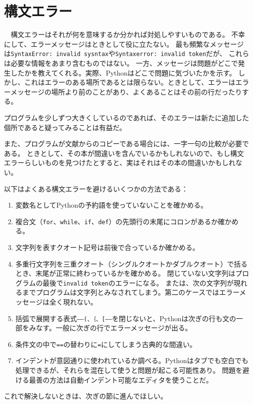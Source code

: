 \documentclass[a4j,12pt,makeidx]{jbook}
\begin{document}
\section{構文エラー}
　構文エラーはそれが何を意味するか分かれば対処しやすいものである。
不幸にして、エラーメッセージはときとして役に立たない。
最も頻繁なメッセージは{\tt SyntaxError: invalid sysntax}や{\tt Syntaxerror: invalid token}だが、
これらは必要な情報をあまり含むものではない。
一方、メッセージは問題がどこで発生したかを教えてくれる。実際、Pythonはどこで問題に気づいたかを示す。
しかし、これはエラーのある場所であるとは限らない。ときとして、エラーはエラーメッセージの場所より前のことがあり、よくあることはその前の行だったりする。\par
プログラムを少しずつ大きくしているのであれば、そのエラーは新たに追加した個所であると疑ってみることは有益だ。\par
また、プログラムが文献からのコピーである場合には、一字一句の比較が必要である。
ときとして、その本が間違いを含んでいるかもしれないので、もし構文エラーらしいものを見つけたとすると、実はそれはその本の間違いかもしれない。\par
以下はよくある構文エラーを避けるいくつかの方法である：
\begin{enumerate}
\item 変数名としてPythonの予約語を使っていないことを確かめる。
\item 複合文（{\tt for}、{\tt while}、{\tt if}、{\tt def}）の先頭行の末尾にコロンがあるか確かめる。
\item 文字列を表すクオート記号は前後で合っているか確かめる。
\item 多重行文字列を三重クオート（シングルクオートかダブルクオート）で括るとき、末尾が正常に終わっているかを確かめる。
閉じていない文字列はプログラムの最後で{\tt invalid token}のエラーになる。
または、次の文字列が現れるまでプログラムは文字列とみなされてしまう。第二のケースではエラーメッセージは全く現れない。
\item 括弧で展開する表式―{\verb"(、｛、["}―を閉じないと、Pythonは次ぎの行も文の一部をみなす。一般に次ぎの行でエラーメッセージが出る。
\item 条件文の中で{\tt ==}の替わりに{\tt =}にしてしまう古典的な間違い。
\item インデントが意図通りに使われているか調べる。Pythonはタブでも空白でも処理できるが、それらを混在して使うと問題が起こる可能性あり。
問題を避ける最善の方法は自動インデント可能なエディタを使うことだ。
\end{enumerate}
これで解決しないときは、次ぎの節に進んでほしい。
\end{document}
